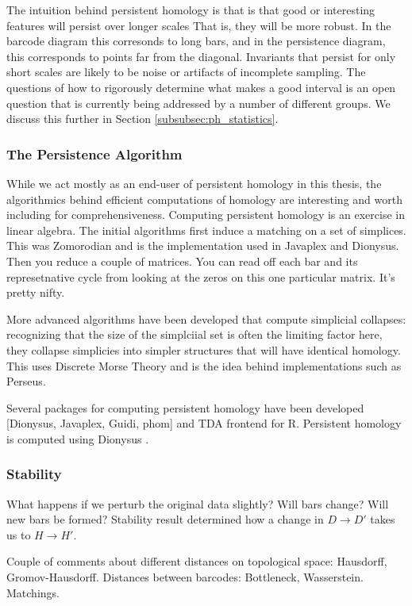 The intuition behind persistent homology is that is that good or interesting features will persist over longer scales
That is, they will be more robust.
In the barcode diagram this corresonds to long bars, and in the persistence diagram, this corresponds to points far from the diagonal.
Invariants that persist for only short scales are likely to be noise or artifacts of incomplete sampling.
The questions of how to rigorously determine what makes a good interval is an open question that is currently being addressed by a number of different groups.
We discuss this further in Section \ref{subsubsec:ph_statistics}.

\subsubsection{The Persistence Algorithm}

While we act mostly as an end-user of persistent homology in this thesis, the algorithmics behind efficient computations of homology are interesting and worth including for comprehensiveness.
Computing persistent homology is an exercise in linear algebra.
The initial algorithms first induce a matching on a set of simplices.
This was Zomorodian and is the implementation used in Javaplex and Dionysus.
Then you reduce a couple of matrices.
You can read off each bar and its represetnative cycle from looking at the zeros on this one particular matrix.
It's pretty nifty.

More advanced algorithms have been developed that compute simplicial collapses: recognizing that the size of the simplciial set is often the limiting factor here, they collapse simplicies into simpler structures that will have identical homology.
This uses Discrete Morse Theory and is the idea behind implementations such as Perseus.

Several packages for computing persistent homology have been developed [Dionysus, Javaplex, Guidi, phom] and TDA frontend for R.
Persistent homology is computed using Dionysus \cite{Morozov:2012}.

\subsubsection{Stability}

What happens if we perturb the original data slightly?
Will bars change?
Will new bars be formed?
Stability result determined how a change in $D\rightarrow D'$ takes us to $H\rightarrow H'$.

Couple of comments about different distances on topological space: Hausdorff, Gromov-Hausdorff.
Distances between barcodes: Bottleneck, Wasserstein. Matchings.


